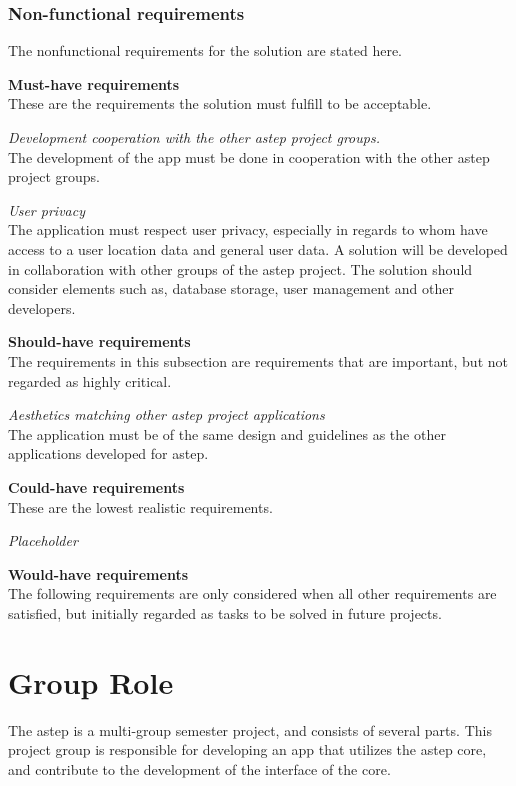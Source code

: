 \subsection{Non-functional requirements}
The nonfunctional requirements for the solution are stated here.

\textbf{Must-have requirements}\\
These are the requirements the solution must fulfill to be acceptable.

\textit{Development cooperation with the other \gls{astep} project groups.}\\
The development of the app must be done in cooperation with the other \gls{astep} project groups.

\textit{User privacy}\\
The application must respect user privacy, especially in regards  to whom have access to a user location data and general user data.
A solution will be developed in collaboration with other groups of the \gls{astep} project. The solution should consider elements such as, database storage, user management and other developers.

\textbf{Should-have requirements}\\
The requirements in this subsection are requirements that are important, but not regarded as highly critical.

\textit{Aesthetics matching other \gls{astep} project applications}\\
The application must be of the same design and guidelines as the other applications developed for \gls{astep}.

\textbf{Could-have requirements}\\
These are the lowest realistic requirements. 

\textit{Placeholder}\\

\textbf{Would-have requirements}\\
The following requirements are only considered when all other requirements are satisfied, but initially regarded as tasks to be solved in future projects.



\chapter{Group Role}
The \gls{astep} is a multi-group semester project, and consists of several parts. This project group is responsible for developing an app that utilizes the \gls{astep} core, and contribute to the development of the interface of the core.

